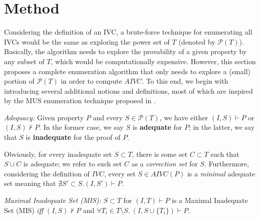\section{Method}
\label{sec:allivcs}

\newcommand{\getivc}{\textsc{GetIVC}}
\newcommand{\getmodel}{\textsc{GetLiteralsFromMaxModel}}
\newcommand{\aivcalg}{AIVC\xspace}
\newcommand{\blockup}{\textsc{BlockUp}}
\newcommand{\blockdown}{\textsc{BlockDown}}
\newcommand{\mis}{\textsc{MIS}}
\newcommand{\mcs}{\textsc{MCS}}

\newcommand{\checksat}{\textsc{CheckSat}}
\newcommand{\isadeq}{\textsc{CheckAdq}}
\newcommand{\actlit}{\textsc{ActLit}}
\newcommand{\unsatcore}{\textsc{UnsatCore}\xspace}
\newcommand{\unsat}{\texttt{UNSAT}\xspace}
\newcommand{\sat}{\texttt{SAT}\xspace}

Considering the definition of an IVC, a brute-force technique for enumerating all IVCs would be the same as exploring the power set of $T$ (denoted by $ \mathcal{P}(T) $).
Basically, the algorithm needs to explore the provability of a
given property by any subset of $T$, which would be computationally expensive.
However, this section proposes a complete
enumeration algorithm that only needs to explore a (small) portion of $\mathcal{P}(T)$
in order to compute $AIVC$. To this end, we begin with introducing several additional notions and definitions, most of which are inspired by the MUS enumeration technique proposed in \cite{marco2016fast}.

\begin{definition} {\emph{Adequacy:}}
\label{def:adeq}
Given property $P$ and every $S \in \mathcal{P}(T)$, we have either $(I, S) \vdash P$ or $(I, S) \nvdash P$. In the former case, we say $S$ is \textbf{adequate} for $P$; in the latter, we say that $S$ is \textbf{inadequate} for the proof of $P$.
\end{definition}

Obviously, for every inadequate set $S \subset T$, there is some set $C \subset T$ such that $S \cup C$ is adequate; we refer to such set $C$ as a \emph{correction set} for $S$. Furthermore, considering the definition of $IVC$, every set $S \in AIVC (P)$ is a \emph{minimal} adequate set meaning  that $\nexists S' \subset S. (I, S') \vdash P$.

\begin{definition}{\emph{Maximal Inadequate Set (MIS):}}
  \label{def:mis}
  $S \subset T$ for $(I, T) \vdash P$ is a Maximal Inadequate Set (MIS) \emph{iff}
  $(I, S) \nvdash P$ and $\forall T_i \in T\setminus S.~ (I, S\cup\{T_i\}) \vdash P$.
\end{definition}

